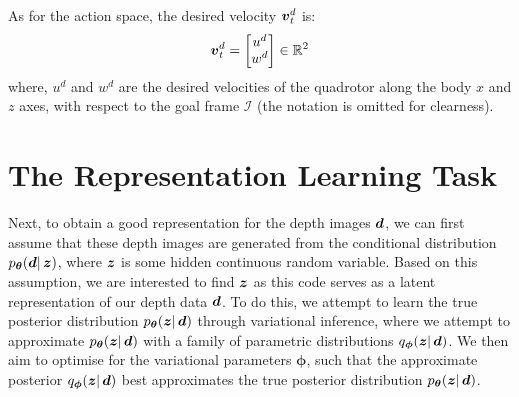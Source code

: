 As for the action space, the desired velocity ${\boldsymbol{v}}_t^d$ is:
\begin{equation}
    {\boldsymbol{v}}_t^d = \begin{bmatrix}
        u^d \\
        w^d
    \end{bmatrix} \in \mathbb{R}^{2}
    \label{eq:4_quadrotor_action_space}
\end{equation}
where, $u^d$ and $w^d$ are the desired velocities of the quadrotor along the body $x$ and $z$ axes, with respect to the goal frame $\mathcal{I}$ (the notation is omitted for clearness).

\section{The Representation Learning Task}
\label{sec:4_representation_learning_task}
Next, to obtain a good representation for the depth images ${\boldsymbol{d}}$, we can first assume that these depth images are generated from the conditional distribution $p_{\boldsymbol{\theta}}({\boldsymbol{d}} |\, \boldsymbol{z})$, where $\boldsymbol{z}$ is some hidden continuous random variable. Based on this assumption, we are interested to find $\boldsymbol{z}$ as this code serves as a latent representation of our depth data ${\boldsymbol{d}}$. To do this, we attempt to learn the true posterior distribution $p_{\boldsymbol{\theta}}(\boldsymbol{z} |\, {\boldsymbol{d}})$ through variational inference, where we attempt to approximate $p_{\boldsymbol{\theta}}(\boldsymbol{z} |\, {\boldsymbol{d}})$ with a family of parametric distributions $q_{\boldsymbol{\phi}}(\boldsymbol{z} |\, {\boldsymbol{d}})$. We then aim to optimise for the variational parameters $\boldsymbol{\phi}$, such that the approximate posterior $q_{\boldsymbol{\phi}}(\boldsymbol{z} |\, {\boldsymbol{d}})$ best approximates the true posterior distribution $p_{\boldsymbol{\theta}}(\boldsymbol{z} |\, {\boldsymbol{d}})$.

